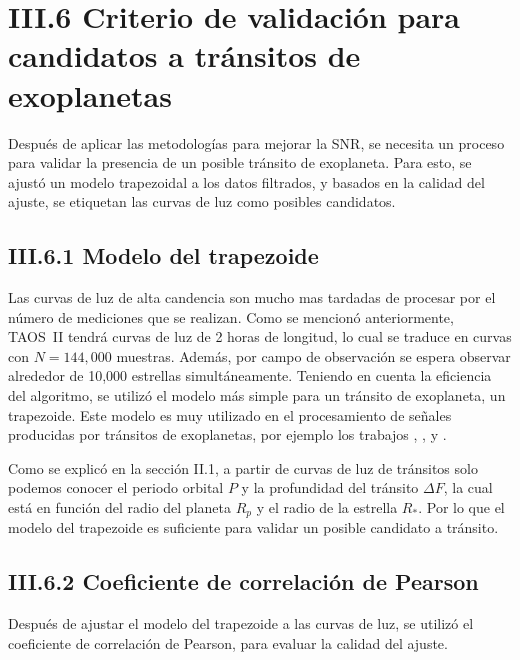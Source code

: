 \section*{III.6 Criterio de validación para candidatos a tránsitos de exoplanetas}

Después de aplicar las metodologías para mejorar la SNR, se necesita un proceso para validar la presencia de un posible tránsito de exoplaneta. Para esto, se ajustó un modelo trapezoidal a los datos filtrados, y basados en la calidad del ajuste, se etiquetan las curvas de luz como posibles candidatos.

\subsection*{III.6.1 Modelo del trapezoide}

Las curvas de luz de alta candencia son mucho mas tardadas de procesar por el número de mediciones que se realizan. Como se mencionó anteriormente, TAOS~II tendrá curvas de luz de 2 horas de longitud, lo cual se traduce en curvas con $N=144,000$ muestras. Además, por campo de observación se espera observar alrededor de 10,000 estrellas simultáneamente. Teniendo en cuenta la eficiencia del algoritmo, se utilizó el modelo más simple para un tránsito de exoplaneta, un trapezoide. Este modelo es muy utilizado en el procesamiento de señales producidas por tránsitos de exoplanetas, por ejemplo los trabajos \cite{alapini2010transiting}, \cite{hippke2019optimized}, \cite{kipping2016observational} y \cite{morton2012efficient}.


Como se explicó en la sección II.1, a partir de curvas de luz de tránsitos solo podemos conocer el periodo orbital $P$ y la profundidad del tránsito $\Delta F$, la cual está en función del radio del planeta $R_{p}$ y el radio de la estrella $R_{*}$. Por lo que el modelo del trapezoide es suficiente para validar un posible candidato a tránsito.

\subsection*{III.6.2 Coeficiente de correlación de Pearson}

Después de ajustar el modelo del trapezoide a las curvas de luz, se utilizó el coeficiente de correlación de Pearson, para evaluar la calidad del ajuste. 

